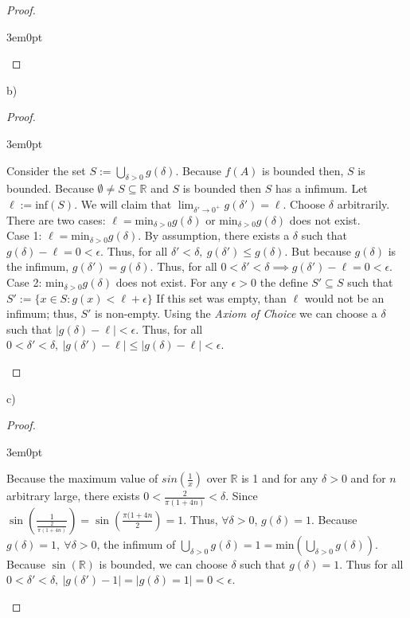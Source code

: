 \documentclass[11pt]{article}
\newcommand{\R}{\mathbb{R}}
\newenvironment{myproof}
{\begin{proof} \begin{adjustwidth}{3em}{0pt}$ $\par\nobreak\ignorespaces}
{\end{adjustwidth} \end{proof}}
\begin{document}
\begin{flushleft}
\begin{myproof}
\end{myproof}

b)

\begin{myproof}

Consider the set $S := \bigcup_{ \delta > 0} g(\delta)$. Because $f(A)$ is bounded then, $S$ is bounded. Because $\emptyset \neq S \subseteq \R$ and $S$ is bounded then $S$ has a infimum. Let $\ell := \text{inf}(S)$. We will claim that $\lim_{\delta' \to 0^+} g(\delta') = \ell$. Choose $\delta$ arbitrarily. There are two cases: $\ell = \text{min}_{\delta > 0}g(\delta)$ or $\text{min}_{\delta > 0}g(\delta)$ does not exist. \\
Case 1: $\ell = \text{min}_{\delta > 0}g(\delta)$. By assumption, there exists a $\delta$ such that $g(\delta) - \ell = 0 < \epsilon$. Thus, for all $\delta' < \delta, \ g(\delta') \leq g(\delta)$. But because $g(\delta)$ is the infimum, $g(\delta') = g(\delta)$. Thus, for all $0 <\delta' < \delta \implies g(\delta') - \ell = 0 < \epsilon$. \\
Case 2: $\text{min}_{\delta > 0}g(\delta)$ does not exist. For any $\epsilon > 0$ the define $S' \subseteq S$ such that $S' := \{ x \in S: g(x) < \ell + \epsilon \}$ If this set was empty, than $\ell$ would not be an infimum; thus, $S'$ is non-empty. Using the \textit{Axiom of Choice} we can choose a $\delta$ such that $|g(\delta) - \ell| < \epsilon$. Thus, for all $ 0 <\delta' < \delta, \ |g(\delta') - \ell| \leq |g(\delta) - \ell| < \epsilon$. 

\end{myproof}

c)

\begin{myproof}

Because the maximum value of $sin(\frac{1}{x})$ over $\R$ is 1 and for any $\delta > 0$ and for $n$ arbitrary large, there exists $0 < \frac{2}{\pi(1+4n)}< \delta$. Since $\sin (\frac{1}{\frac{2}{\pi(1+4n)}})= \sin(\frac{\pi(1+4n}{2}) = 1$. Thus, $\forall \delta > 0$, $g(\delta) = 1$. Because $g(\delta) = 1, \ \forall \delta > 0$, the infimum of $\bigcup_{\delta > 0} g(\delta) = 1 = \text{min}( \bigcup_{\delta > 0} g(\delta))$. Because $\sin(\R)$ is bounded, we can choose $\delta$ such that $g(\delta) = 1$. Thus for all $0 < \delta' < \delta, \ |g(\delta') - 1| = |g(\delta) = 1| = 0 < \epsilon$.

\end{myproof}

\end{flushleft}
\end{document}
